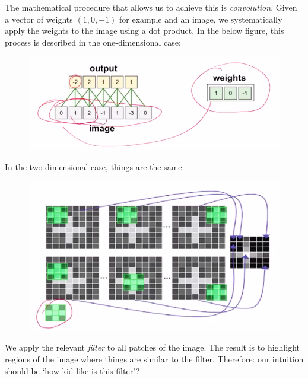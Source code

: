 The mathematical procedure that allows us to achieve this is \textit{convolution}. Given a vector of weights $(1,0,-1)$ for example and an image, we systematically apply the weights to the image using a dot product. In the below figure, this process is described in the one-dimensional case:

\begin{figure}[H]
\centering 
\includegraphics[scale=0.3]{convolution.png}
\end{figure}

In the two-dimensional case, things are the same:
\begin{figure}[H]
\centering
\includegraphics[scale=0.3]{2dconvolution.png}
\end{figure}
We apply the relevant \textit{filter} to all patches of the image. The result is to highlight regions of the image where things are similar to the filter. Therefore: our intuition should be `how kid-like is this filter'?



